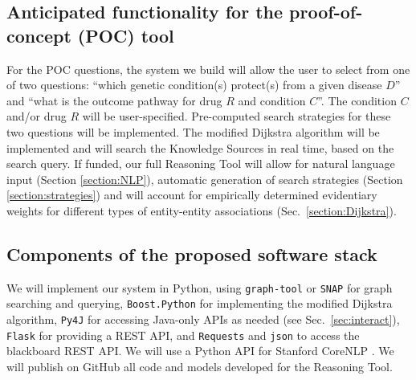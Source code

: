 \documentclass[11pt,notitlepage]{article}
\begin{document}
\subsection{Anticipated functionality for the proof-of-concept (POC) tool}
For the POC questions, the system we build will allow the user to select from
one of two questions: ``which genetic condition(s) protect(s) from a given
disease $D$'' and ``what is the outcome pathway for drug $R$ and condition
$C$''. The condition $C$ and/or drug $R$ will be user-specified. Pre-computed
search strategies for these two questions will be implemented.  The modified
Dijkstra algorithm will be implemented and will search the Knowledge Sources in
real time, based on the search query.  If funded, our full Reasoning Tool will
allow for natural language input (Section \ref{section:NLP}), automatic
generation of search strategies (Section \ref{section:strategies}) and will
account for empirically determined evidentiary weights for different types of
entity-entity associations (Sec.~\ref{section:Dijkstra}).

\subsection{Components of the proposed software stack}
We will implement our system in Python, using \verb|graph-tool|
\cite{peixoto_graph-tool_2014} or \verb|SNAP| \cite{leskovec2016snap} for graph
searching and querying, \verb|Boost.Python| \cite{boostpython} for implementing
the modified Dijkstra algorithm, \verb|Py4J| \cite{Py4J} for accessing Java-only
APIs as needed (see Sec.~\ref{sec:interact}), \verb|Flask|
\cite{grinberg2014flask} for providing a REST API, and \verb|Requests| and 
 \verb|json| to access the blackboard REST API. We
will use a Python API for Stanford CoreNLP \cite{manning2014stanford}.  We will
publish on GitHub all code and models developed for the Reasoning Tool.



\end{document}
